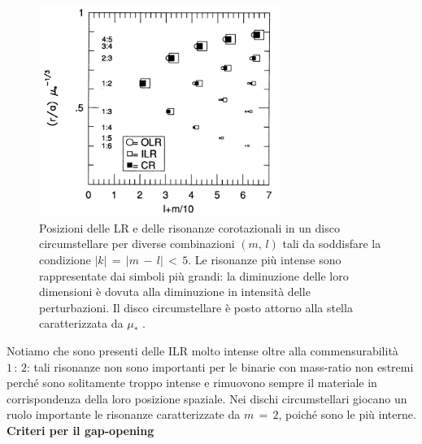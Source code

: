 \begin{figure}[h]
  \centering
  \includegraphics[width=0.7\textwidth]{Immagini/IntroTeorica/Risonanze_circumstellare.png}
  \caption{Posizioni delle LR e delle risonanze corotazionali in un disco circumstellare per diverse combinazioni $(m,\,l)$ tali da soddisfare la condizione $|k|\,=\,|m\,-\,l|\,<\,5$. Le risonanze più intense sono rappresentate dai simboli più grandi: la diminuzione delle loro dimensioni è dovuta alla diminuzione in intensità delle perturbazioni. Il disco circumstellare è posto attorno alla stella caratterizzata da $\mu_\ast$ \parencite{ArtymowiczLubow1994}. }
  \label{fig:pos_ris}
\end{figure}
Notiamo che sono presenti delle ILR molto intense oltre alla commensurabilità $1\,:\,2$: tali risonanze non sono importanti per le binarie con mass-ratio non estremi perché sono solitamente troppo intense e rimuovono sempre il materiale in corrispondenza della loro posizione spaziale.
Nei dischi circumstellari giocano un ruolo importante le risonanze caratterizzate da $m\,=\,2$, poiché sono le più interne.
\\

\textbf{Criteri per il gap-opening}\\

